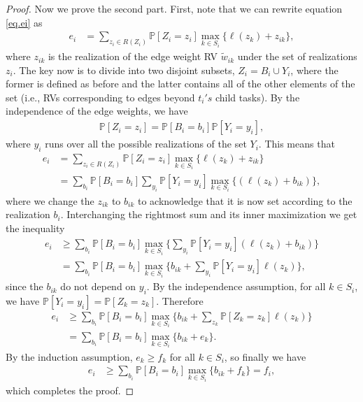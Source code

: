\documentclass[12pt]{article}
\def\P{\mathbb{P}}
\begin{document}
\begin{proof}
Now we prove the second part. First, note that we can rewrite equation \eqref{eq.ei} as 
\begin{align*}
e_i &= \sum_{z_i \in R(Z_i)} \P[Z_i = z_i] \max_{k \in S_i} \{ \ell(z_{k}) + z_{ik} \},
\end{align*}
	where $z_{ik}$ is the realization of the edge weight RV $\tilde{w}_{ik}$ under the set of realizations $z_i$. The key now is to divide into two disjoint subsets, $Z_i = B_i \cup Y_i$, where the former is defined as before and the latter contains all of the other elements of the set (i.e., RVs corresponding to edges beyond $t_i's$ child tasks). By the independence of the edge weights, we have
	\begin{align*}
	\P[Z_i = z_i] = \P[B_i = b_i] \P[Y_i = y_i],
	\end{align*}
	where $y_i$ runs over all the possible realizations of the set $Y_i$. This means that 
	\begin{align*}
	e_i &= \sum_{z_i \in R(Z_i)} \P[Z_i = z_i] \max_{k \in S_i} \{ \ell(z_{k}) + z_{ik} \} \\
	&= \sum_{b_i} \P[B_i = b_i] \sum_{y_i} \P[Y_i = y_i]\max_{k \in S_i} \{ (\ell(z_{k}) + b_{ik}) \},
	\end{align*}
	where we change the $z_{ik}$ to $b_{ik}$ to acknowledge that it is now set according to the realization $b_i$. 
	Interchanging the rightmost sum and its inner maximization we get the inequality
	\begin{align*}
	e_i &\geq \sum_{b_i} \P[B_i = b_i] \max_{k \in S_i}  \bigg \{ \sum_{y_i} \P[Y_i = y_i] (\ell(z_{k}) + b_{ik} ) \bigg \} \\
	&= \sum_{b_i} \P[B_i = b_i] \max_{k \in S_i} \bigg \{ b_{ik} + \sum_{y_i} \P[Y_i = y_i] \ell(z_{k}) \bigg \},
	\end{align*}
	since the $b_{ik}$ do not depend on $y_i$. By the independence assumption, for all $k \in S_i$, we have $\P[Y_i = y_i] = \P[Z_k = z_k]$. Therefore 
	\begin{align*}
	e_i &\geq \sum_{b_i} \P[B_i = b_i] \max_{k \in S_i} \bigg \{ b_{ik} + \sum_{z_k} \P[Z_k = z_k] \ell(z_{k}) \bigg \} \\
	&= \sum_{b_i} \P[B_i = b_i] \max_{k \in S_i} \{ b_{ik} + e_k \}.
	\end{align*}
	By the induction assumption, $e_k \geq f_k$ for all $k \in S_i$, so finally we have
	\begin{align*}
	e_i &\geq \sum_{b_i} \P[B_i = b_i] \max_{k \in S_i} \{ b_{ik} + f_k \} = f_i,
	\end{align*}
	which completes the proof.
\end{proof}
\end{document}
